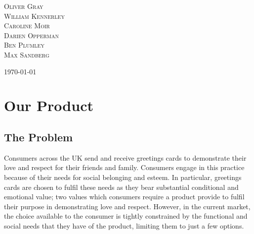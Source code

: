 \documentclass[10pt,a4paper]{article}
\begin{document}
\begin{titlepage}


	\vspace{0.5\baselineskip} %

{\scshape\Large Oliver Gray\\ }
{\scshape\Large William Kennerley\\}
{\scshape\Large Caroline Moir\\}
{\scshape\Large Darien Opperman\\ }
{\scshape\Large Ben Plumley\\}
{\scshape\Large Max Sandberg\\}



	\vspace{1.0\baselineskip} %


	\vfill %



	\vspace{0.3\baselineskip} %

	\today


\end{titlepage}


\raggedright
\setlength{\parskip}{6pt}
\setlength{\parindent}{0pt}

\section*{Our Product}
\subsection*{The Problem}
Consumers across the UK send and receive greetings cards to demonstrate their love and respect for their friends and family. Consumers engage in this practice because of their needs for social belonging and esteem. In particular, greetings cards are chosen to fulfil these needs as they bear substantial conditional and emotional value; two values which consumers require a product provide to fulfil their purpose in demonstrating love and respect. However, in the current market, the choice available to the consumer is tightly constrained by the functional and social needs that they have of the product, limiting them to just a few options.
\end{document}
